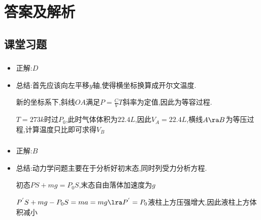 \documentclass{article}
\begin{document}
\section{答案及解析}
\subsection{课堂习题}
\subsubsection{}
\begin{itemize}
    \item 正解:\quad $D$
    \item 总结:\quad 首先应该向左平移$y$轴,使得横坐标换算成开尔文温度.

          \hspace{3.3em}新的坐标系下,斜线$OA$满足$P = \frac{C}{V}T$斜率为定值,因此为等容过程.

          \hspace{3.3em}$T = 273k$时过$P_{0}$,此时气体体积为$22.4L$,因此$V_{A} = 22.4L$,横线$A \ra B$为等压过程,计算温度只比即可求得$V_{B}$
\end{itemize}

\vspace{2em}

\subsubsection{}
\begin{itemize}
    \item 正解:\quad $B$
    \item 总结:\quad 动力学问题主要在于分析好初末态,同时列受力分析方程.

          \hspace{3.3em}初态$PS + mg = P_{0}S$,末态自由落体加速度为$g$

          \hspace{3.3em}$P^{'}S + mg - P_{0}S = ma = mg \lra P^{'} = P_{0}$液柱上方压强增大,因此液柱上方体积减小
\end{itemize}

\vspace{2em}
\end{document}
